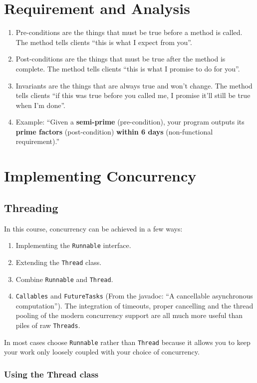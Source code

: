 \documentclass{article}
\begin{document}
\section{Requirement and Analysis}
\begin{enumerate}
    \item Pre-conditions are the things that must be true before a method is called. The method tells clients ``this is what I expect from you''.
    \item Post-conditions are the things that must be true after the method is complete. The method tells clients ``this is what I promise to do for you''.
    \item Invariants are the things that are always true and won't change. The method tells clients ``if this was true before you called me, I promise it'll still be true when I'm done''.
    \item Example: ``Given a \textbf{semi-prime} (pre-condition), your program outputs its \textbf{prime factors} (post-condition) \textbf{within 6 days} (non-functional requirement).''
\end{enumerate}


\section{Implementing Concurrency}
\subsection{Threading}
In this course, concurrency can be achieved in a few ways:
\begin{enumerate}
    \item Implementing the \lstinline{Runnable} interface.
    \item Extending the \lstinline{Thread} class.
    \item Combine \lstinline{Runnable} and \lstinline{Thread}.
    \item \lstinline{Callables} and \lstinline{FutureTasks} (From the javadoc: ``A cancellable asynchronous computation''). The integration of timeouts, proper cancelling and the thread pooling of the modern concurrency support are all much more useful than piles of raw \lstinline{Threads}.
\end{enumerate}
In most cases choose \lstinline{Runnable} rather than \lstinline{Thread} because it allows you to keep your work only loosely coupled with your choice of concurrency.

\subsubsection{Using the Thread class}
\end{document}
